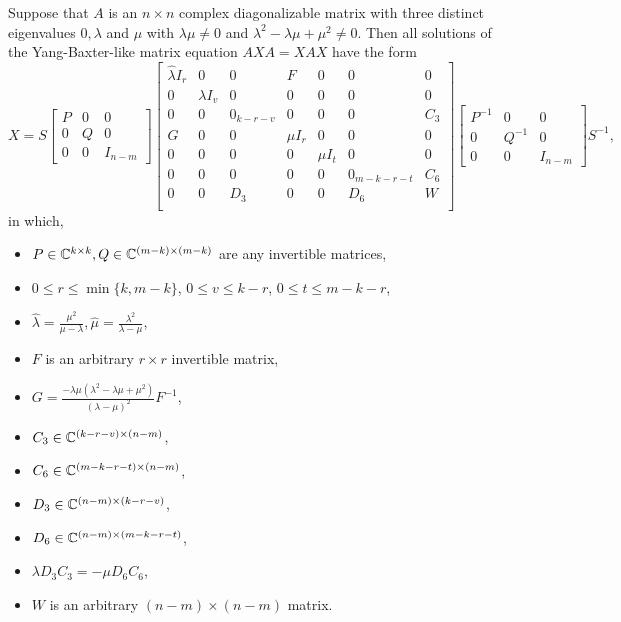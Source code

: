 \documentclass{article}
\begin{document}
\begin{theorem} \label{solutions}
  Suppose that $A$ is an $n \times n$ complex diagonalizable matrix with three distinct eigenvalues $0, \lambda$ and $\mu$ with $\lambda \mu \neq 0$ and $\lambda^2 - \lambda \mu + \mu^2 \neq 0$.
  Then all solutions of the Yang-Baxter-like matrix equation $A X A = X A X$ have the form
  \[X = S \begin{bmatrix} P & 0 & 0\\ 0 & Q & 0\\ 0 & 0 & I_{n - m} \end{bmatrix} \left[ \begin{array}{ccc|ccc|c} \widehat{\lambda} I_r & 0 & 0 & F & 0 & 0 & 0 \\ 0 & \lambda I_v & 0 & 0 & 0 & 0 & 0 \\ 0 & 0 & 0_{k - r - v} & 0 & 0 & 0 & C_3 \\ \hline G & 0 & 0 & \widehat{\mu} I_r & 0 & 0 & 0 \\ 0 & 0 & 0 & 0 & \mu I_t & 0 & 0 \\ 0 & 0 & 0 & 0 & 0 & 0_{m - k - r - t} & C_6 \\ \hline 0 & 0 & D_3 & 0 & 0 & D_6 & W \\ \end{array} \right] \begin{bmatrix} P^{-1} & 0 & 0\\ 0 & Q^{-1} & 0\\ 0 & 0 & I_{n - m} \end{bmatrix} S^{-1},\]
  in which,
  \begin{itemize}
    \item $P \in \mathbb{C}^{k \times k}, Q \in \mathbb{C}^{(m - k) \times (m - k)}$ are any invertible matrices, 
    \item $0 \le r \le \min \{k, m - k\}$, $0 \le v \le k - r$, $0 \le t \le m - k - r$, 
    \item $\widehat{\lambda} = \frac{\mu^2}{\mu - \lambda}, \widehat{\mu} = \frac{\lambda^2}{\lambda - \mu}$,
    \item $F$ is an arbitrary $r \times r$ invertible matrix, 
    \item $G = \frac{- \lambda \mu (\lambda^2 - \lambda \mu + \mu^2)}{(\lambda - \mu)^2} F^{-1}$, 
    \item $C_3 \in \mathbb{C}^{(k - r - v) \times (n - m)}$, 
    \item $C_6 \in \mathbb{C}^{(m - k - r - t) \times (n - m)}$, 
    \item $D_3 \in \mathbb{C}^{(n - m) \times (k - r - v)}$, 
    \item $D_6 \in \mathbb{C}^{(n - m) \times (m - k - r - t)}$, 
    \item $\lambda D_3 C_3 = - \mu D_6 C_6$, 
    \item $W$ is an arbitrary $(n - m) \times (n - m)$ matrix.
  \end{itemize}
\end{theorem}
\end{document}
